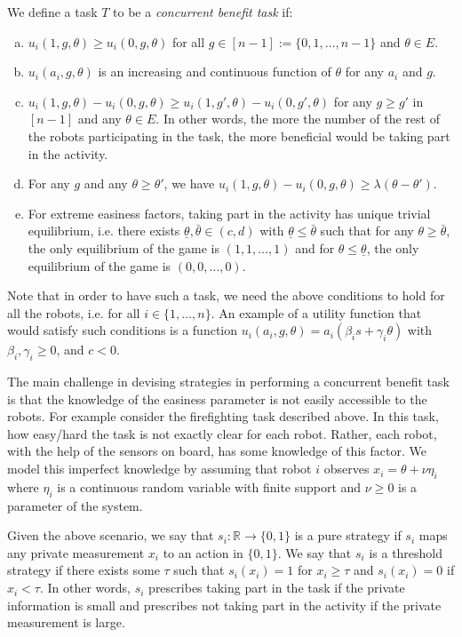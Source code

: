 \documentclass[conference]{ieeeconf}
\def\R{\mathbb{R}}
\begin{document}
We define a task $T$ to be a \textit{concurrent benefit task} if: 
\begin{enumerate}[a.]
	\item $u_i(1,g,\theta)\geq u_i(0,g,\theta)$ for all $g\in[n-1]:=\{0,1,\ldots,n-1\}$ and $\theta \in E$. 
	\item $u_i(a_i,g,\theta)$ is an increasing and continuous function of $\theta$ for any $a_i$ and $g$. 
	\item $u_i(1,g,\theta)-u_i(0,g,\theta)\geq u_i(1,g',\theta)-u_i(0,g',\theta)$ for any $g\geq g'$ in $[n-1]$ and any $\theta\in E$. In other words, the more the number of the rest of the robots participating in the task, the more beneficial would be taking part in the activity.
	\item For any $g$ and any $\theta\geq \theta'$, we have $u_i(1,g,\theta)-u_i(0,g,\theta)\geq \lambda (\theta-\theta')$. 
	\item For extreme easiness factors, taking part in the activity has unique trivial equilibrium, i.e. there exists $\underline{\theta},\bar{\theta}\in (c,d)$ with $\underline{\theta}\leq \bar{\theta}$ such that for any $\theta\geq \bar{\theta}$, the only equilibrium of the game is $(1,1,\ldots,1)$ and for $\theta\leq \underline{\theta}$, the only equilibrium of the game is $(0,0,\ldots,0)$.
\end{enumerate}

Note that in order to have such a task, we need the above conditions to hold for all the robots, i.e. for all $i\in\{1,\ldots,n\}$.
An example of a utility function that would satisfy such conditions is a function $u_i(a_i,g,\theta)=a_i(\beta_is+\gamma_i\theta)$ with $\beta_i,\gamma_i\geq 0$, and $c<0$.

The main challenge in devising strategies in performing a concurrent benefit task is that the knowledge of the easiness parameter is not easily accessible to the robots. For example consider the firefighting task described above. In this task, how easy/hard the task is not exactly clear for each robot. Rather, each robot, with the help of the sensors on board, has some knowledge of this factor. We model this imperfect knowledge by assuming that robot $i$ observes $x_i=\theta+\nu \eta_i$ where $\eta_i$ is a continuous random variable with finite support and $\nu\geq 0$ is a parameter of the system. 


Given the above scenario, we say that $s_i:\R\to \{0,1\}$ is a pure strategy if  $s_i$ maps any private measurement $x_i$ to an action in $\{0,1\}$. We say that $s_i$ is a threshold strategy if there exists some $\tau$ such that $s_i(x_i)=1$ for $x_i\geq \tau$ and $s_i(x_i)=0$ if $x_i<\tau$. In other words, $s_i$ prescribes taking part in the task if the private information is small and prescribes not taking part in the activity if the private measurement is large. 
\end{document}
